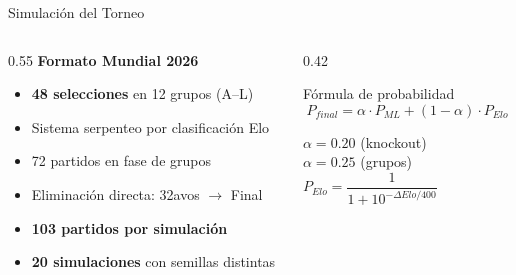 \documentclass[aspectratio=169,11pt]{beamer}
\begin{document}
\begin{frame}{Simulaci\'on del Torneo}
\begin{columns}[T]
\begin{column}{0.55\textwidth}
\textbf{\color{acento} Formato Mundial 2026}

\vspace{4pt}
\begin{itemize}
  \item \textbf{48 selecciones} en 12 grupos (A--L)
  \item Sistema serpenteo por clasificaci\'on Elo
  \item 72 partidos en fase de grupos
  \item Eliminaci\'on directa: 32avos $\to$ Final
  \item \textbf{103 partidos por simulaci\'on}
  \item \textbf{20 simulaciones} con semillas distintas
\end{itemize}
\end{column}

\begin{column}{0.42\textwidth}
\begin{block}{F\'ormula de probabilidad}
\vspace{-2pt}
\[ P_{final} = \alpha \cdot P_{ML} + (1-\alpha) \cdot P_{Elo} \]

\vspace{4pt}
{\small\color{acento!70!white}
$\alpha = 0.20$ (knockout)\\
$\alpha = 0.25$ (grupos)\\[4pt]
$P_{Elo} = \dfrac{1}{1 + 10^{-\Delta Elo/400}}$
}
\end{block}
\end{column}
\end{columns}
\end{frame}
\end{document}
